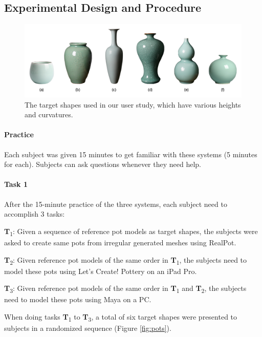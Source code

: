 \documentclass{svjour3}                     %
\begin{document}
\subsection{Experimental Design and Procedure}
\label{sec:6.3}

\begin{figure}
\includegraphics[width=\textwidth]{fig12}
\caption{The target shapes used in our user study, which have various heights and curvatures.}
\label{fig:target}
\end{figure}

\paragraph{Practice} Each subject was given 15 minutes to get familiar with these systems (5 minutes for each). Subjects can ask questions whenever they need help.

\paragraph{Task 1} After the 15-minute practice of the three systems, each subject need to accomplish 3 tasks:

\textbf{T}\textsubscript{1}: Given a sequence of reference pot models as target shapes, the subjects were asked to create same pots from irregular generated meshes using RealPot. 

\textbf{T}\textsubscript{2}: Given reference pot models of the same order in \textbf{T}\textsubscript{1}, the subjects need to model these pots using Let's Create! Pottery on an iPad Pro.

\textbf{T}\textsubscript{3}: Given reference pot models of the same order in \textbf{T}\textsubscript{1} and \textbf{T}\textsubscript{2}, the subjects need to model these pots using Maya on a PC.

When doing tasks \textbf{T}\textsubscript{1} to \textbf{T}\textsubscript{3}, a total of six target shapes were presented to subjects in a randomized sequence (Figure \ref{fig:pots}).
\end{document}
